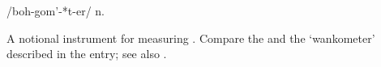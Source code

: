  /boh-gom'-*t-er/ n.

A notional instrument for measuring . Compare the
 and the `wankometer' described in the 
entry; see also .

